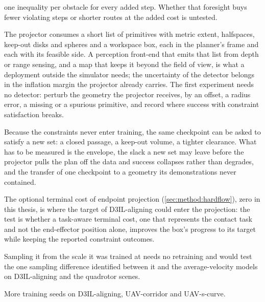 \begin{description}
    one inequality per obstacle for every added step. Whether that foresight buys fewer violating
    steps or shorter routes at the added cost is untested.
  \item[Constraints from perception.] The projector consumes a short list of primitives with metric
    extent, halfspaces, keep-out disks and spheres and a workspace box, each in the planner's frame and
    each with its feasible side. A perception front-end that emits that list from depth or range
    sensing, and a map that keeps it beyond the field of view, is what a deployment outside the
    simulator needs; the uncertainty of the detector belongs in the inflation margin the projector
    already carries. The first experiment needs no detector: perturb the geometry the projector
    receives, by an offset, a radius error, a missing or a spurious primitive, and record where success
    with constraint satisfaction breaks.
  \item[Re-tasking at deployment.] Because the constraints never enter training, the same checkpoint
    can be asked to satisfy a new set: a closed passage, a keep-out volume, a tighter clearance. What
    has to be measured is the envelope, the slack a new set may leave before the projector pulls the
    plan off the data and success collapses rather than degrades, and the transfer of one checkpoint to
    a geometry its demonstrations never contained.
  \item[The alignment target.] The optional terminal cost of endpoint projection
    (\autoref{sec:method:hardflow}), zero in this thesis, is where the target of D3IL-aligning could
    enter the projection: the test is whether a task-aware terminal cost, one that represents the
    contact task and not the end-effector position alone, improves the box's progress to its target
    while keeping the reported constraint outcomes.
  \item[The sampler of instantaneous-velocity matching.] Sampling it from the scale it was trained at
    needs no retraining and would test the one sampling difference identified between it and the
    average-velocity models on D3IL-aligning and the quadrotor scenes.  \item[Seeds.] More training seeds on D3IL-aligning, UAV-corridor and UAV-s-curve.
\end{description}
